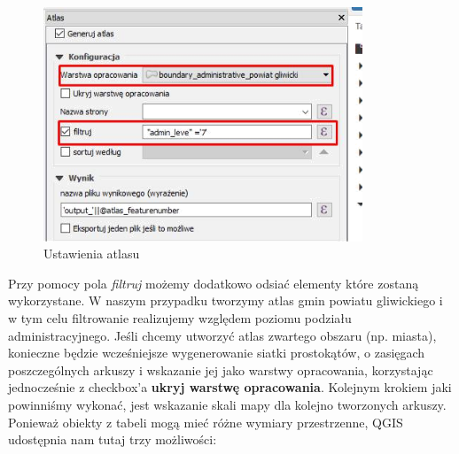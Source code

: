 \documentclass[12pt,a4paper]{book}
\begin{document}
\begin{figure}[ht]
	\centering
	\includegraphics[height=7.0cm]{008-atlas.png}
	\caption{Ustawienia atlasu}
\end{figure}
Przy pomocy pola \textit{filtruj} możemy dodatkowo odsiać elementy które zostaną wykorzystane. W naszym przypadku tworzymy atlas gmin powiatu gliwickiego i w tym celu filtrowanie realizujemy względem poziomu podziału administracyjnego. Jeśli chcemy utworzyć atlas zwartego obszaru (np. miasta), konieczne będzie wcześniejsze wygenerowanie siatki prostokątów, o zasięgach poszczególnych arkuszy i wskazanie jej jako warstwy opracowania, korzystając jednocześnie z checkbox'a \textbf{ukryj warstwę opracowania}. Kolejnym krokiem jaki powinniśmy wykonać, jest wskazanie skali mapy dla kolejno tworzonych arkuszy. Ponieważ obiekty z tabeli mogą mieć różne wymiary przestrzenne, QGIS udostępnia nam tutaj trzy możliwości:
\end{document}
